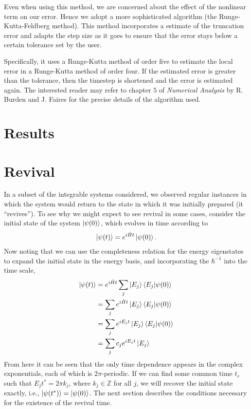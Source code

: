 \documentclass[a4paper, 10pt]{article}
\theoremstyle{plain}
\begin{document}

Even when using this method, we are concerned about the effect of the nonlinear
term on our error. Hence we adopt a more sophisticated algorithm
(the Runge-Kutta-Feldberg method). This method incorporates a estimate of the
truncation error and adapts the step size as it goes to ensure that the error
stays below a certain tolerance set by the user.

Specifically, it uses a Runge-Kutta method of order five to estimate the
local error in a Runge-Kutta method of order four. If the estimated error
is greater than the tolerance, then the timestep is shortened and the error is
estimated again. The interested reader may refer to chapter $5$ of
\emph{Numerical Analysis} by R. Burden and J. Faires \cite{Burden2005} for the
precise details of the algorithm used.


\section{Results}

\section{Revival \label{revival}}

In a subset of the integrable systems considered, we observed regular instances
in which the system would return to the state in which it was initially
prepared (it ``revives''). To see why we might expect to see revival in
some cases, consider the initial state of the system $\ket{\psi(0)}$, which
evolves in time according to
\begin{equation}
    \ket{\psi(t)} = e^{i \hat{H} t} \ket{\psi(0)}.
\end{equation}
Now noting that we can use the completeness relation for the energy eigenstates
to expand the initial state in the energy basis, and incorporating the
$\hbar^{-1}$ into the time scale,
\begin{align}
\label{time_evolution}
 \ket{\psi(t)} &= e^{i\hat{H}t}\sum_j\ket{E_j}\braket{E_j|\psi(0)}  \nonumber \\
               &= \sum_je^{i\hat{H}t}\ket{E_j}\braket{E_j|\psi(0)}  \nonumber \\
               &= \sum_je^{iE_{j}t}\ket{E_j}\braket{E_j|\psi(0)}    \nonumber \\
               &= \sum_j c_{j}e^{iE_{j}t}\ket{E_j}
\end{align}
From here it can be seen that the only time dependence appears in the complex
exponentials, each of which is $2 \pi$-periodic. If we can find some common time
$t_{r}$ such that $E_{j} t^{\ast} = 2 \pi k_{j}$, where $k_{j} \in \mathbb{Z}$
for all $j$, we will recover the initial state exactly, i.e.,
$\ket{\psi(t^{\ast})} = \ket{\psi(0)}$. The next section describes the
conditions necessary for the existence of the revival time.
\end{document}
